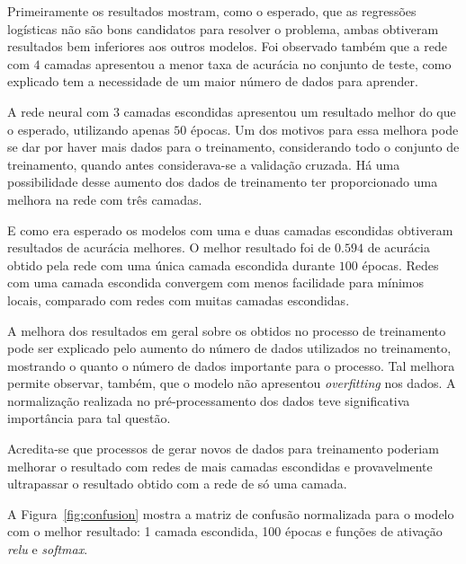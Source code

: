 \documentclass[conference]{IEEEtran}
\begin{document}
Primeiramente os resultados mostram, como o esperado, que as regressões logísticas não são bons candidatos para resolver o problema, ambas obtiveram resultados bem inferiores aos outros modelos. Foi observado também que a rede com $4$ camadas apresentou a menor taxa de acurácia no conjunto de teste, como explicado  tem a necessidade de um maior número de dados para aprender.

A rede neural com $3$ camadas escondidas apresentou um resultado melhor do que o esperado, utilizando apenas $50$ épocas. Um dos motivos para essa melhora pode se dar por haver mais dados para o treinamento, considerando todo o conjunto de treinamento, quando antes considerava-se a validação cruzada. Há uma possibilidade desse aumento dos dados de treinamento ter proporcionado uma melhora na rede com três camadas.

E como era esperado os modelos com uma e duas camadas escondidas obtiveram resultados de acurácia melhores. O melhor resultado foi de $0.594$ de acurácia obtido pela rede com uma única camada escondida durante $100$ épocas. Redes com uma camada escondida convergem com menos facilidade para mínimos locais, comparado com redes com muitas camadas escondidas.

A melhora dos resultados em geral sobre os obtidos no processo de treinamento pode ser explicado pelo aumento do número de dados utilizados no treinamento, mostrando o quanto o número de dados importante para o processo. Tal melhora permite observar, também, que o modelo não apresentou \emph{overfitting} nos dados. A normalização realizada no pré-processamento dos dados teve significativa importância para tal questão.

Acredita-se que processos de gerar novos de dados para treinamento poderiam melhorar o resultado com redes de mais camadas escondidas e provavelmente ultrapassar o resultado obtido com a rede de só uma camada.

A Figura~\ref{fig:confusion} mostra a matriz de confusão normalizada para o modelo com o melhor resultado: 1 camada escondida, 100 épocas e funções de ativação \emph{relu} e \emph{softmax}.
\end{document}
